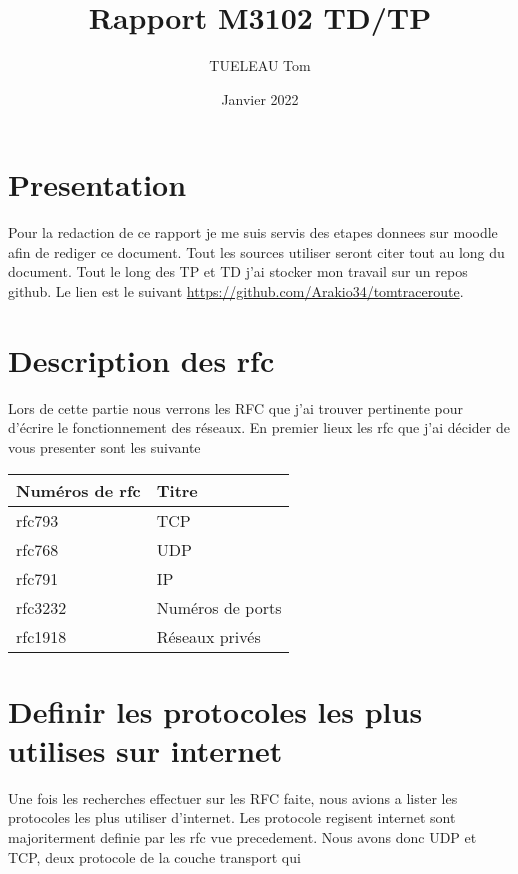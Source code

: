 \documentclass[5pt]{article}
\title{Rapport M3102 TD/TP}
\author{TUELEAU Tom}
\date{Janvier 2022}
\begin{document}
    \maketitle    
    \tableofcontents
    \newpage
    \section{Presentation}
    Pour la redaction de ce rapport je me suis servis des etapes donnees sur moodle afin de rediger ce document. Tout les sources utiliser seront citer tout au long du document. Tout le long des TP et TD j'ai stocker mon travail sur un repos github. Le lien est le suivant \url{https://github.com/Arakio34/tomtraceroute}.
    

    \section{Description des rfc}
    Lors de cette partie nous verrons les RFC que j'ai trouver pertinente pour d'écrire le fonctionnement des réseaux. En premier lieux les rfc que j'ai décider de vous presenter sont les suivante 
    \begin{center}
        \begin{tabular}{|l|l|}
            \hline
            Numéros de rfc & Titre \\
            \hline
            rfc793 & TCP \\
            \hline
            rfc768 & UDP \\
            \hline
            rfc791 & IP \\
            \hline
            rfc3232 & Numéros de ports \\
            \hline
            rfc1918 & Réseaux privés \\
            \hline
        \end{tabular}
    \end{center}
    
    \section{Definir les protocoles les plus utilises sur internet}
    Une fois les recherches effectuer sur les RFC faite, nous avions a lister les protocoles les plus utiliser d'internet. Les protocole regisent internet sont majoriterment definie par les rfc vue precedement. Nous avons donc UDP et TCP, deux protocole de la couche transport qui  
    
\end{document}
